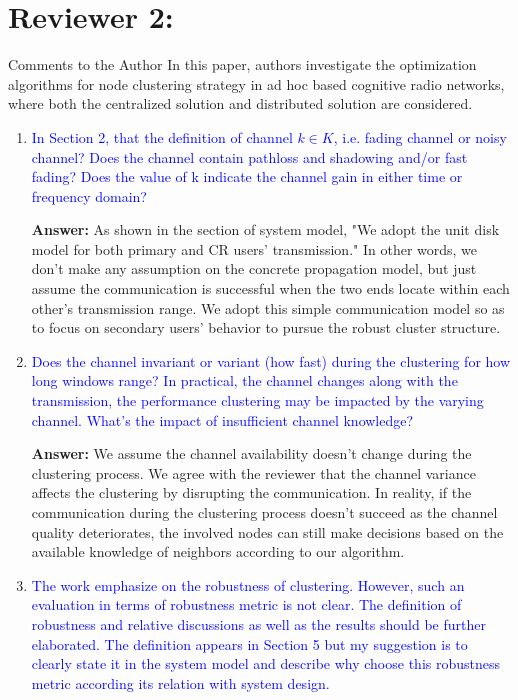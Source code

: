 \documentclass[10pt,a4paper]{article}
\begin{document}
\section{Reviewer 2:}

Comments to the Author
In this paper, authors investigate the optimization algorithms for node clustering strategy in ad hoc based cognitive radio networks, where both the centralized solution and distributed solution are considered.
\begin{enumerate}


\item \textcolor{blue}{ In Section 2, that the definition of channel $k\in K$, i.e. fading channel or noisy channel? Does the channel contain pathloss and shadowing and/or fast fading? Does the value of k indicate the channel gain in either time or frequency domain? }

\textbf{Answer:} As shown in the section of system model, "We adopt the unit disk model for both primary and CR users’ transmission."
In other words, we don't make any assumption on the concrete propagation model, but just assume the communication is successful when the two ends locate within each other's transmission range.
We adopt this simple communication model so as to focus on secondary users' behavior to pursue the robust cluster structure.

\item \textcolor{blue}{ Does the channel invariant or variant (how fast) during the clustering for how long windows range? In practical, the channel changes along with the transmission, the performance clustering may be impacted by the varying channel. What's the impact of insufficient channel knowledge?}

\textbf{Answer:} We assume the channel availability doesn't change during the clustering process.
We agree with the reviewer that the channel variance affects the clustering by disrupting the communication.
In reality, if the communication during the clustering process doesn't succeed as the channel quality deteriorates, the involved nodes can still make decisions based on the available knowledge of neighbors according to our algorithm.


\item \textcolor{blue}{ The work emphasize on the robustness of clustering. However, such an evaluation in terms of robustness metric is not clear. The definition of robustness and relative discussions as well as the results should be further elaborated. The definition appears in Section 5 but my suggestion is to clearly state it in the system model and describe why choose this robustness metric according its relation with system design.}


\end{enumerate}
\end{document}
